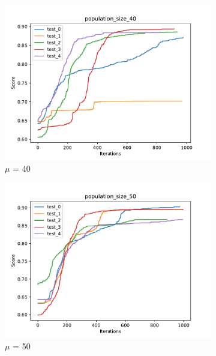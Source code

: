 \begin{figure}[H]
\begin{subfigure}[b]{0.49\linewidth}
        \includegraphics[width=\linewidth]{img/population_size_40.pdf}
        \caption{$\mu$ = 40}
    \end{subfigure}
    \begin{subfigure}[b]{0.49\linewidth}
        \includegraphics[width=\linewidth]{img/population_size_50.pdf}
        \caption{$\mu$ = 50}
    \end{subfigure}
    \begin{subfigure}[b]{0.49\linewidth}

\end{subfigure}
\end{figure}
